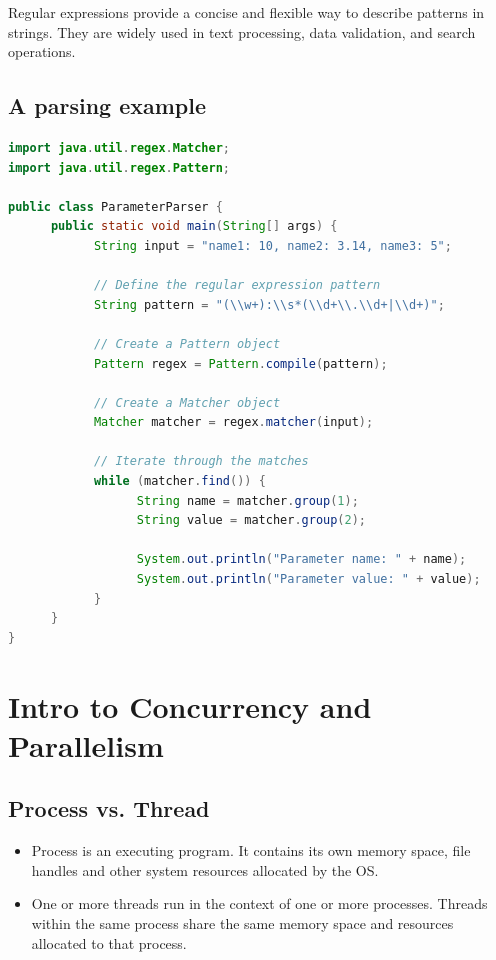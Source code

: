 \documentclass[letterpaper,12pt]{article}
\begin{document}
Regular expressions provide a concise and flexible way to describe patterns in strings. They are widely used in text processing, data validation, and search operations.
\subsection{A parsing example}
\begin{lstlisting}[language=Java]
import java.util.regex.Matcher;
import java.util.regex.Pattern;

public class ParameterParser {
      public static void main(String[] args) {
            String input = "name1: 10, name2: 3.14, name3: 5";

            // Define the regular expression pattern
            String pattern = "(\\w+):\\s*(\\d+\\.\\d+|\\d+)";

            // Create a Pattern object
            Pattern regex = Pattern.compile(pattern);

            // Create a Matcher object
            Matcher matcher = regex.matcher(input);

            // Iterate through the matches
            while (matcher.find()) {
                  String name = matcher.group(1);
                  String value = matcher.group(2);

                  System.out.println("Parameter name: " + name);
                  System.out.println("Parameter value: " + value);
            }
      }
}      
\end{lstlisting}


\section{Intro to Concurrency and Parallelism}
\subsection{Process vs. Thread}
\begin{itemize}
      \item Process is an executing program. It contains its own memory space, file handles and other system resources allocated by the OS.
      \item One or more threads run in the context of one or more processes. Threads within the same process share the same memory space and resources allocated to that process. 
\end{itemize}
\end{document}
